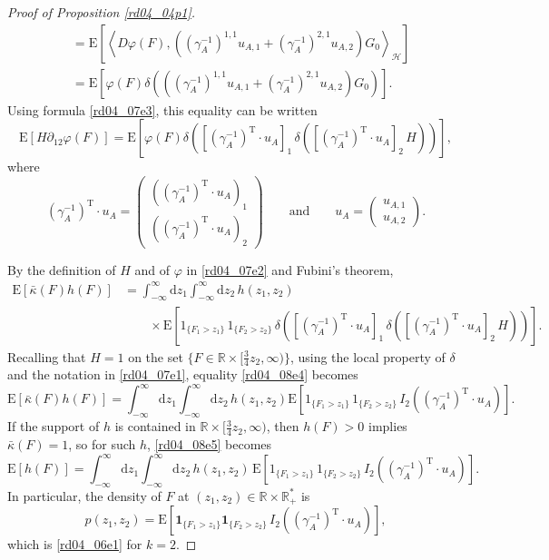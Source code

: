 \documentclass[12pt,a4paper]{article}
\newcommand{\R}{{\mathbb{R}}}
\newcommand{\E}{\mathrm{E}}
\newcommand{\HH}{\mathcal{H}}
\newcommand{\rT}{\text{T}}
\renewcommand{\d}{\mathrm{d}}
\newcommand{\<}{\langle}
\renewcommand{\>}{\rangle}
\begin{document}
\begin{proof}[Proof of Proposition \ref{rd04_04p1}]
\begin{align*}
   & = \E \left[ \left\langle D\varphi(F), \left((\gamma_A^{-1})^{1,1} u_{A,1} + (\gamma_A^{-1})^{2,1} u_{A,2} \right) G_0 \right\rangle_\HH \right] \\
    & = \E\left[ \varphi(F) \delta \left(\left( (\gamma_A^{-1})^{1,1}  u_{A,1} + (\gamma_A^{-1})^{2,1} u_{A,2}\right) G_0\right) \right].
   \end{align*}
Using formula \eqref{rd04_07e3}, this equality can be written
   \[  
    \E[H \partial_{12} \varphi(F)] = \E\left[ \varphi(F) \delta \left([(\gamma_A^{-1})^\rT \cdot u_A ]_1\, \delta\left([(\gamma_A^{-1})^\rT \cdot u_A ]_2\, H \right) \right) \right],
  \]
  where
\[  
         (\gamma_A^{-1})^\rT \cdot u_A = \left(\begin{array}{c}
           \left((\gamma_A^{-1})^\rT \cdot u_A \right)_1 \\  [6pt]
           \left((\gamma_A^{-1})^\rT \cdot u_A \right)_2 \end{array} \right) \qquad\text{and}\qquad u_A = \left(\begin{array}{c} u_{A,1} \\  u_{A,2} \end{array} \right).
\]

 By the definition of $H$ and of $\varphi$ in \eqref{rd04_07e2} and Fubini's theorem,
  \begin{align}\nonumber
      \E[\bar{\kappa}(F) h(F)] &=  \int_{-\infty}^\infty \d z_1 \int_{-\infty}^\infty \d z_2\, h(z_1, z_2) \\
       &\qquad \times \E\left[1_{\{F_1 > z_1\}}\, 1_{\{F_2 > z_2 \}}\,  \delta \left([(\gamma_A^{-1})^\rT \cdot u_A ]_1\, \delta\left([(\gamma_A^{-1})^\rT \cdot u_A ]_2\, H \right) \right)\right].
\label{rd04_08e4}
\end{align} 
Recalling that $H =1$ on the set  $\{F\in \mathbb{R}\times [\frac 34 z_2,\infty)\}$, using the local property of $\delta$ and the notation in \eqref{rd04_07e1}, equality \eqref{rd04_08e4} becomes
 \begin{equation}\label{rd04_08e5}
      \E[\bar{\kappa}(F) h(F)] =   \int_{-\infty}^\infty \d z_1 \int_{-\infty}^\infty \d z_2\, h(z_1, z_2)  \E\left[1_{\{F_1 > z_1\}}\, 1_{\{F_2 > z_2 \}}\,  I_2\left((\gamma_A^{-1})^\rT\cdot u_A \right) \right].
 \end{equation}
If the support of $h$ is contained in $\R \times [\frac{3}{4} z_2, \infty)$, then $h(F) > 0$ implies $\bar{\kappa}(F) = 1$, so for such $h$, \eqref{rd04_08e5} becomes
\[
     \E[h(F)] =   \int_{-\infty}^\infty \d z_1 \int_{-\infty}^\infty \d z_2\, h(z_1, z_2) \, \E\left[1_{\{F_1 > z_1\}}\, 1_{\{F_2 > z_2 \}}\,   I_2\left((\gamma_A^{-1})^\rT \cdot u_A \right) \right].
\]
In particular, 
the density of $F$ at $(z_1,z_2) \in \R \times \R_+^*$ is
\begin{equation}\label{rd07_28e1}
 p(z_1,z_2)= \E \left[ \mathbf{1}_{\{F_1>z_1\}} \mathbf{1}_{\{F_2>z_2\}}\, I_2\left((\gamma_A^{-1})^\rT \cdot u_A \right) \right],
\end{equation}
 which is \eqref{rd04_06e1} for $k=2$. 
 

\end{proof}
\end{document}
